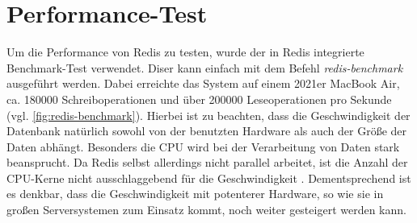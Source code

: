 
\section{Performance-Test}
\label{sec:Performance}
Um die Performance von Redis zu testen, wurde der in Redis integrierte Benchmark-Test verwendet.
Diser kann einfach mit dem Befehl \textit{redis-benchmark} ausgeführt werden.
Dabei erreichte das System auf einem 2021er MacBook Air, ca. 180000 Schreiboperationen und über 200000 Leseoperationen pro Sekunde (vgl. \autoref{fig:redis-benchmark}).
Hierbei ist zu beachten, dass die Geschwindigkeit der Datenbank natürlich sowohl von der benutzten Hardware als auch der Größe der Daten abhängt.
Besonders die CPU wird bei der Verarbeitung von Daten stark beansprucht. Da Redis selbst allerdings nicht parallel arbeitet, ist die Anzahl der CPU-Kerne nicht ausschlaggebend für die Geschwindigkeit \cite{Redis-Docs-Benchmarks}.
Dementsprechend ist es denkbar, dass die Geschwindigkeit mit potenterer Hardware, so wie sie in großen Serversystemen zum Einsatz kommt, noch weiter gesteigert werden kann.
